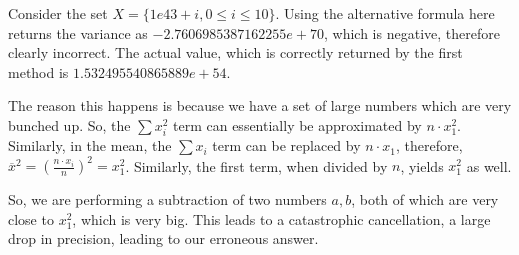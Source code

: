 Consider the set $X = \{1e43 + i, 0 \leq i \leq 10\}$. Using the alternative formula here returns the variance as $-2.7606985387162255e+70$, which is negative, therefore clearly incorrect. The actual value, which is correctly returned by the first method is $1.532495540865889e+54$.\bigskip

The reason this happens is because we have a set of large numbers which are very bunched up. So, the $\sum x_i^2$ term can essentially be approximated by $n\cdot x_1^2$. Similarly, in the mean, the $\sum x_i$ term can be replaced by $n\cdot x_1$, therefore, $\overline{x}^2 = \left(\frac{n\cdot x_i}{n}\right)^2 = x_1^2$. Similarly, the first term, when divided by $n$, yields $x_1^2$ as well.\bigskip

So, we are performing a subtraction of two numbers $a, b$, both of which are very close to $x_1^2$, which is very big. This leads to a catastrophic cancellation, a large drop in precision, leading to our erroneous answer.